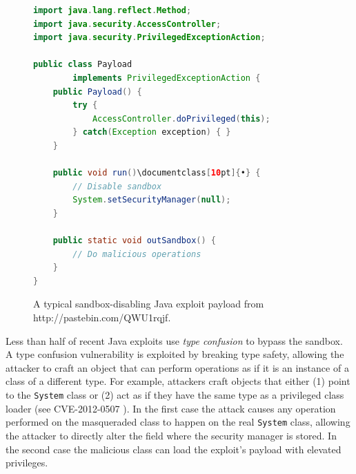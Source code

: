\documentclass{sig-alternate}
\begin{document}
\begin{figure}
\begin{centering}
\begin{lstlisting}[language=Java,basicstyle={\scriptsize}]
import java.lang.reflect.Method; 
import java.security.AccessController; 
import java.security.PrivilegedExceptionAction;   

public class Payload 
        implements PrivilegedExceptionAction {         
    public Payload() {
        try {
            AccessController.doPrivileged(this);
        } catch(Exception exception) { }     
    }

    public void run()\documentclass[10pt]{•} {
        // Disable sandbox
        System.setSecurityManager(null);
    }

    public static void outSandbox() {
        // Do malicious operations
    }
}
\end{lstlisting}

\par\end{centering}

\caption{A typical sandbox-disabling Java exploit payload from http://pastebin.com/QWU1rqjf.}
\label{fig:A-typical-exploit-payload}
\end{figure}


Less than half of recent Java exploits use \textit{type confusion}
to bypass the sandbox. A type confusion vulnerability is exploited
by breaking type safety, allowing the attacker to craft an object
that can perform operations as if it is an instance of a class of
a different type. For example, attackers craft objects that either
(1) point to the \texttt{System} class or (2) act as if they have
the same type as a privileged class loader (see CVE-2012-0507 \cite{_vulnerability_2012_0507}).
In the first case the attack causes any operation performed on the
masqueraded class to happen on the real \texttt{System} class, allowing
the attacker to directly alter the field where the security manager
is stored. In the second case the malicious class can load the exploit's
payload with elevated privileges.
\end{document}
